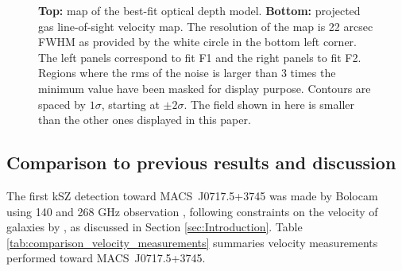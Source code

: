 \documentclass[twocolumn,traditabstract]{aa}
\begin{document}
\begin{figure}[h]
\caption{\footnotesize{{\bf Top:} map of the best-fit optical depth model. {\bf Bottom:} projected gas line-of-sight velocity map. The resolution of the map is 22 arcsec FWHM as provided by the white circle in the bottom left corner. The left panels correspond to fit F1 and the right panels to fit F2. Regions where the rms of the noise is larger than 3 times the minimum value have been masked for display purpose. Contours are spaced by $1 \sigma$, starting at $\pm 2 \sigma$. The field shown in here is smaller than the other ones displayed in this paper.}}
\label{fig:velocity_tau_map}
\end{figure}

\subsection{Comparison to previous results and discussion}
The first kSZ detection toward \mbox{MACS~J0717.5+3745} was made by Bolocam using 140 and 268 GHz observation \citep{Sayers2013}, following constraints on the velocity of galaxies by \cite{Ma2009}, as discussed in Section \ref{sec:Introduction}. Table \ref{tab:comparison_velocity_measurements} summaries velocity measurements performed toward \mbox{MACS~J0717.5+3745}.
\end{document}
